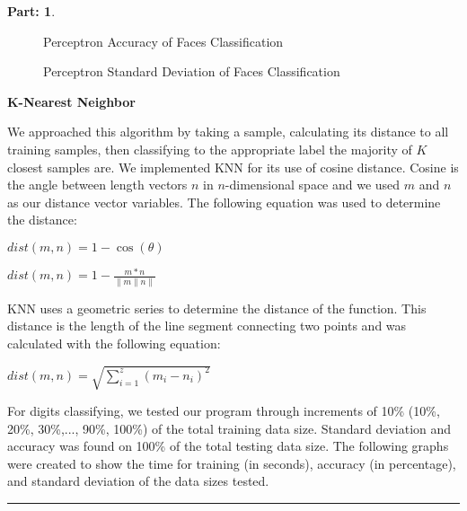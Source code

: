 \documentclass{article}
\theoremstyle{definition}
\def\fline{\rule{0.75\linewidth}{0.5pt}}
\newcommand{\finishline}{\begin{center}\fline\end{center}}
\newtheorem*{solution*}{Part: }
\newenvironment{solution}{\begin{solution*}}{{\finishline} \end{solution*}}
\begin{document}
\begin{solution}
\item
\begin{figure}[h!]
            \centering
            \item 
            \caption{Perceptron Accuracy of Faces Classification}
        \end{figure}
        
\item
\begin{figure}[h!]
            \centering
            \item 
            \caption{Perceptron Standard Deviation of Faces Classification}
        \end{figure}

\begin{newpage}
\end{newpage}



\item \textbf{K-Nearest Neighbor}

\item We approached this algorithm by taking a sample, calculating its distance to all training samples, then classifying to the appropriate label the majority of $K$ closest samples are. We implemented KNN for its use of cosine distance. Cosine is the angle between length vectors $n$ in $n$-dimensional space and we used $m$ and $n$ as our distance vector variables. The following equation was used to determine the distance:
\item $dist(m, n) = 1 - \cos{(\theta)}$
\item $dist(m, n) = 1 - \frac{m*n}{\|m\|n\|}$

\item KNN uses a geometric series to determine the distance of the function. This distance is the length of the line segment connecting two points and was calculated with the following equation:
\item $dist(m, n) = \sqrt{\sum_{i=1}^{z}(m_i - n_i)^2}$

\item For digits classifying, we tested our program through increments of 10\% (10\%, 20\%, 30\%,..., 90\%, 100\%) of the total training data size. Standard deviation and accuracy was found on 100\% of the total testing data size. The following graphs were created to show the time for training (in seconds), accuracy (in percentage), and standard deviation of the data sizes tested. 


\end{solution}
\end{document}
